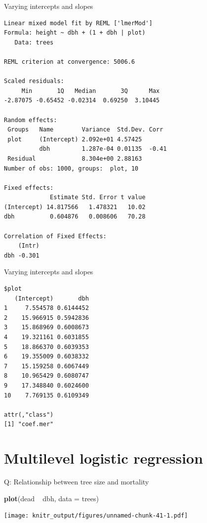 \documentclass[10pt,ignorenonframetext,]{beamer}
\newenvironment{Shaded}{\begin{snugshade}}{\end{snugshade}}
\newcommand{\KeywordTok}[1]{\textcolor[rgb]{0.13,0.29,0.53}{\textbf{{#1}}}}
\newcommand{\DataTypeTok}[1]{\textcolor[rgb]{0.13,0.29,0.53}{{#1}}}
\newcommand{\StringTok}[1]{\textcolor[rgb]{0.31,0.60,0.02}{{#1}}}
\newcommand{\NormalTok}[1]{{#1}}
\begin{document}
\begin{frame}[fragile]{Varying intercepts and slopes}

\begin{verbatim}
Linear mixed model fit by REML ['lmerMod']
Formula: height ~ dbh + (1 + dbh | plot)
   Data: trees

REML criterion at convergence: 5006.6

Scaled residuals: 
     Min       1Q   Median       3Q      Max 
-2.87075 -0.65452 -0.02314  0.69250  3.10445 

Random effects:
 Groups   Name        Variance  Std.Dev. Corr 
 plot     (Intercept) 2.092e+01 4.57425       
          dbh         1.287e-04 0.01135  -0.41
 Residual             8.304e+00 2.88163       
Number of obs: 1000, groups:  plot, 10

Fixed effects:
             Estimate Std. Error t value
(Intercept) 14.817566   1.478321   10.02
dbh          0.604876   0.008606   70.28

Correlation of Fixed Effects:
    (Intr)
dbh -0.301
\end{verbatim}

\end{frame}

\begin{frame}[fragile]{Varying intercepts and slopes}

\begin{verbatim}
$plot
   (Intercept)       dbh
1     7.554578 0.6144452
2    15.966915 0.5942836
3    15.868969 0.6008673
4    19.321161 0.6031855
5    18.866370 0.6039353
6    19.355009 0.6038332
7    15.159258 0.6067449
8    10.965429 0.6080747
9    17.348840 0.6024600
10    7.769135 0.6109349

attr(,"class")
[1] "coef.mer"
\end{verbatim}

\end{frame}

\section{Multilevel logistic
regression}\label{multilevel-logistic-regression}

\begin{frame}[fragile]{Q: Relationship between tree size and mortality}

\begin{Shaded}
\begin{Highlighting}[]
\KeywordTok{plot}\NormalTok{(dead ~}\StringTok{ }\NormalTok{dbh, }\DataTypeTok{data =} \NormalTok{trees)}
\end{Highlighting}
\end{Shaded}

\texttt{[image: knitr\_output/figures/unnamed-chunk-41-1.pdf]}

\end{frame}
\end{document}
